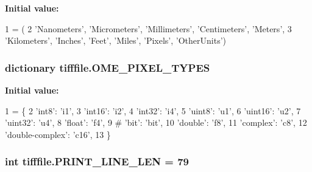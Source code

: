 {\bfseries Initial value\-:}
\begin{DoxyCode}
1 = (
2     \textcolor{stringliteral}{'Nanometers'}, \textcolor{stringliteral}{'Micrometers'}, \textcolor{stringliteral}{'Millimeters'}, \textcolor{stringliteral}{'Centimeters'}, \textcolor{stringliteral}{'Meters'},
3     \textcolor{stringliteral}{'Kilometers'}, \textcolor{stringliteral}{'Inches'}, \textcolor{stringliteral}{'Feet'}, \textcolor{stringliteral}{'Miles'}, \textcolor{stringliteral}{'Pixels'}, \textcolor{stringliteral}{'OtherUnits'})
\end{DoxyCode}
\hypertarget{namespacetifffile_a74bcdb69b979a5d0a0cf93df6e815ce3}{
\subsubsection[{O\-M\-E\-\_\-\-P\-I\-X\-E\-L\-\_\-\-T\-Y\-P\-E\-S}]{\setlength{\rightskip}{0pt plus 5cm}dictionary tifffile.\-O\-M\-E\-\_\-\-P\-I\-X\-E\-L\-\_\-\-T\-Y\-P\-E\-S}}\label{namespacetifffile_a74bcdb69b979a5d0a0cf93df6e815ce3}
{\bfseries Initial value\-:}
\begin{DoxyCode}
1 = \{
2     \textcolor{stringliteral}{'int8'}: \textcolor{stringliteral}{'i1'},
3     \textcolor{stringliteral}{'int16'}: \textcolor{stringliteral}{'i2'},
4     \textcolor{stringliteral}{'int32'}: \textcolor{stringliteral}{'i4'},
5     \textcolor{stringliteral}{'uint8'}: \textcolor{stringliteral}{'u1'},
6     \textcolor{stringliteral}{'uint16'}: \textcolor{stringliteral}{'u2'},
7     \textcolor{stringliteral}{'uint32'}: \textcolor{stringliteral}{'u4'},
8     \textcolor{stringliteral}{'float'}: \textcolor{stringliteral}{'f4'},
9     \textcolor{comment}{# 'bit': 'bit',}
10     \textcolor{stringliteral}{'double'}: \textcolor{stringliteral}{'f8'},
11     \textcolor{stringliteral}{'complex'}: \textcolor{stringliteral}{'c8'},
12     \textcolor{stringliteral}{'double-complex'}: \textcolor{stringliteral}{'c16'},
13 \}
\end{DoxyCode}
\hypertarget{namespacetifffile_aba60fb8bee718e1ac4434956652c21bb}{
\subsubsection[{P\-R\-I\-N\-T\-\_\-\-L\-I\-N\-E\-\_\-\-L\-E\-N}]{\setlength{\rightskip}{0pt plus 5cm}int tifffile.\-P\-R\-I\-N\-T\-\_\-\-L\-I\-N\-E\-\_\-\-L\-E\-N = 79}}\label{namespacetifffile_aba60fb8bee718e1ac4434956652c21bb}
